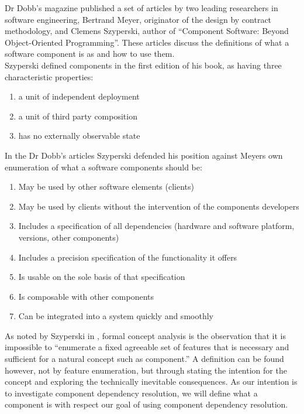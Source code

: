 Dr Dobb's magazine published a set of articles by two leading researchers in software engineering, Bertrand Meyer, originator of the design by contract methodology, 
and Clemens Szyperski, author of ``Component Software: Beyond Object-Oriented Programming''. 
These articles \cite{szyperski_components_2000, szyperski_point_2000, meyer_what_2000,meyer_significance_1999} discuss the
definitions of what a software component is as and how to use them.\\ 
Szyperski defined components in the first edition of his book, \cite{szyperski_component_2002} as having three characteristic properties:
\begin{enumerate}
  \item a unit of independent deployment
  \item a unit of third party composition
  \item has no externally observable state
\end{enumerate}

In the Dr Dobb's articles Szyperski defended his position against Meyers own enumeration of what a software components should be:
\begin{enumerate}
  \item May be used by other software elements (clients)
  \item May be used by clients without the intervention of the components
  developers
  \item Includes a specification of all dependencies (hardware and software
  platform, versions, other components)
  \item Includes a precision specification of the functionality it offers
  \item Is usable on the sole basis of that specification
  \item Is composable with other components
  \item Can be integrated into a system quickly and smoothly
\end{enumerate}

{}As noted by Szyperski in \cite{Szyperski2002}, 
{}formal concept analysis \cite{Ganter1999} is the observation that it is impossible to
{}``enumerate a fixed agreeable set of features that is necessary and sufficient for a natural concept such as component.'' 
{}A definition can be found however, not by feature enumeration, but through stating the intention for the concept and exploring the technically inevitable consequences. 
{}As our intention is to investigate component dependency resolution, we will define what a component is with respect our goal of using component dependency resolution.

